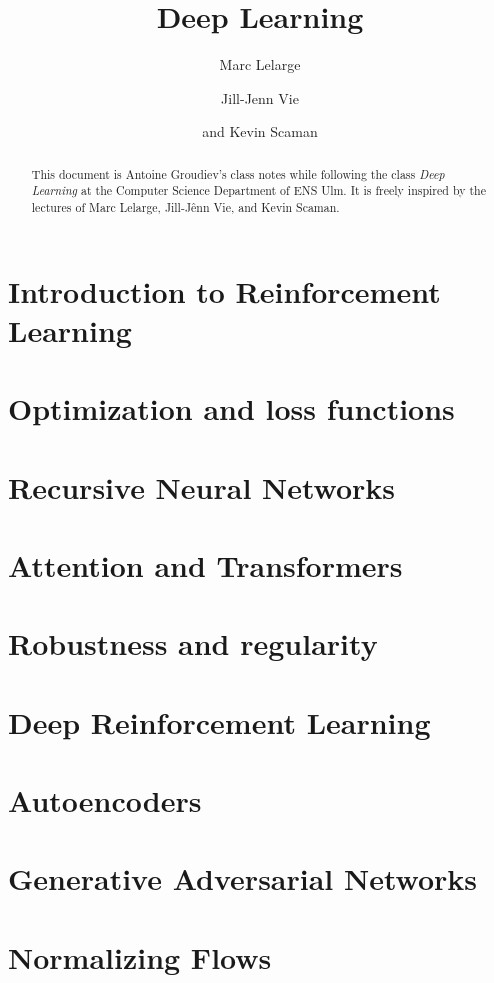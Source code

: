 \documentclass[toc, titlepaged]{../cs-classes/cs-classes}
\title{Deep Learning}
\author{Marc Lelarge\and Jill-Jenn Vie\and and Kevin Scaman}
\begin{document}
\begin{abstract}
    This document is Antoine Groudiev's class notes while following the class \emph{Deep Learning} at the Computer Science Department of ENS Ulm. It is freely inspired by the lectures of Marc Lelarge, Jill-Jênn Vie, and Kevin Scaman. 
\end{abstract}



\newpage

\newpage

\section{Introduction to Reinforcement Learning}

\section{Optimization and loss functions}



\section{Recursive Neural Networks}

\section{Attention and Transformers}

\section{Robustness and regularity}

\section{Deep Reinforcement Learning}

\section{Autoencoders}

\section{Generative Adversarial Networks}

\section{Normalizing Flows}
\end{document}
